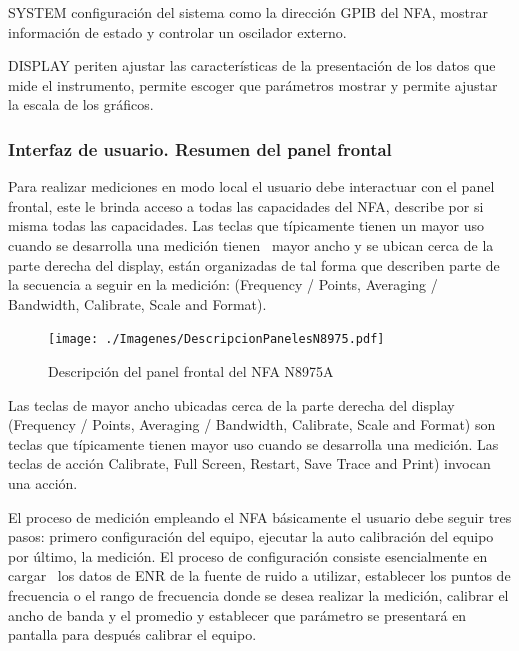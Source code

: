 	SYSTEM configuración del sistema como la dirección GPIB del NFA, mostrar información de estado y controlar un oscilador externo.
	
	DISPLAY periten ajustar las características de la presentación de los datos que mide el instrumento, permite escoger que	parámetros mostrar y permite ajustar la escala de los gráficos.
			

	\clearpage
	\subsubsection{Interfaz de usuario. Resumen del panel frontal}
	Para realizar mediciones en modo local el usuario debe interactuar con el panel frontal, este le brinda acceso a todas las capacidades del NFA, describe por si misma todas las capacidades. Las teclas que típicamente tienen un mayor uso cuando se desarrolla una medición tienen \ mayor ancho y se ubican cerca de la parte derecha del display, están organizadas de tal forma que describen parte de la secuencia a seguir en la medición: (Frequency / Points, Averaging	/ Bandwidth, Calibrate, Scale and Format).
	
	\begin{figure}[h!]
		\centering
		\texttt{[image: ./Imagenes/DescripcionPanelesN8975.pdf]}
		\caption{Descripción del panel frontal del NFA N8975A}
		\label{Fig:DescripcionPanelesN8975}	
	\end{figure}
	
	Las teclas de mayor ancho ubicadas cerca de la parte derecha del display (Frequency / Points, Averaging / Bandwidth, Calibrate, Scale and Format) son teclas que típicamente tienen mayor uso cuando se desarrolla una medición. Las teclas de acción Calibrate, Full Screen, Restart, Save Trace and Print) invocan una acción.
			
	El proceso de medición empleando el NFA básicamente el usuario debe seguir tres pasos: primero configuración del equipo, ejecutar la auto calibración del equipo por último, la medición. El proceso de configuración consiste esencialmente en cargar \ los datos de ENR de la fuente de ruido a utilizar, establecer los puntos de frecuencia o el rango de frecuencia donde se desea realizar la medición, calibrar el ancho de banda y el promedio y establecer que parámetro se presentará en pantalla para después calibrar el equipo.
	

